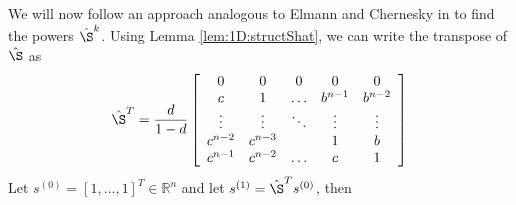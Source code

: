 We will now follow an approach analogous to Elmann and Chernesky in
\cite{ElmChe93} to find the powers $\hat{\S}^k$. Using Lemma
\ref{lem:1D:structShat}, we can write the  transpose of $\hat{\S}$ as
\begin{eqnarray*}
\hat{\S}^{T} = \frac{d}{1-d}
\left[
\begin{array}{cccccc}
0       & 0       & 0       & 0       & 0      \\
c       & 1       & \hdots  & b^{n-1} & b^{n-2}      \\
\vdots & \vdots  & \ddots  & \vdots  & \vdots \\
c^{n-2} & c^{n-3} &         & 1       & b\\
c^{n-1} & c^{n-2} & \hdots  & c       & 1\\
\end{array}
\right]
\end{eqnarray*}
Let $s^{(0)}=\left[1,\ldots,1 \right]^T \in \mathbb{R}^n$ and let
$s^{(1)}=\hat{\S}^Ts^{(0)}$, then
